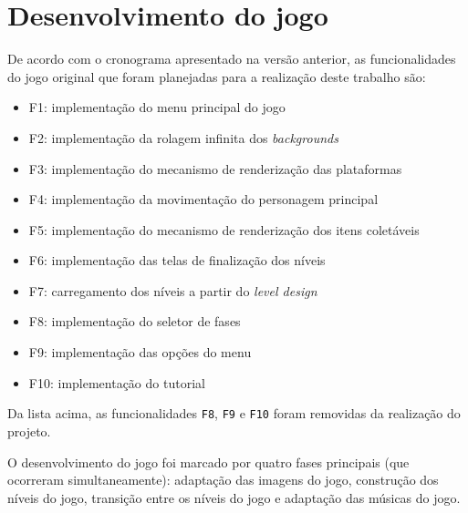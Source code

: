  

  

  

  

  

  

\section{Desenvolvimento do jogo}

  De acordo com o cronograma apresentado na versão anterior, as funcionalidades do jogo original que foram planejadas para a realização deste trabalho são:

  \begin{itemize}
    \item F1: implementação do menu principal do jogo
    \item F2: implementação da rolagem infinita dos \textit{backgrounds}
    \item F3: implementação do mecanismo de renderização das plataformas
    \item F4: implementação da movimentação do personagem principal
    \item F5: implementação do mecanismo de renderização dos itens coletáveis
    \item F6: implementação das telas de finalização dos níveis
    \item F7: carregamento dos níveis a partir do \textit{level design}
    \item F8: implementação do seletor de fases
    \item F9: implementação das opções do menu
    \item F10: implementação do tutorial
  \end{itemize}

  Da lista acima, as funcionalidades \texttt{F8}, \texttt{F9} e \texttt{F10} foram removidas da realização do projeto.

  O desenvolvimento do jogo foi marcado por quatro fases principais (que ocorreram simultaneamente): adaptação das imagens do jogo, construção dos níveis do jogo, transição entre os níveis do jogo e adaptação das músicas do jogo.

  

  

